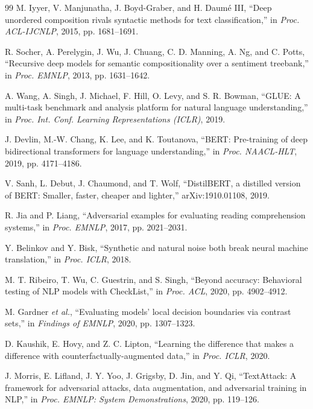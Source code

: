 \documentclass[conference]{IEEEtran}
\begin{document}
\begin{thebibliography}{99}
 M. Iyyer, V. Manjunatha, J. Boyd-Graber, and H. Daum\'e III, ``Deep unordered composition rivals syntactic methods for text classification,'' in \emph{Proc. ACL-IJCNLP}, 2015, pp. 1681--1691.

 R. Socher, A. Perelygin, J. Wu, J. Chuang, C. D. Manning, A. Ng, and C. Potts, ``Recursive deep models for semantic compositionality over a sentiment treebank,'' in \emph{Proc. EMNLP}, 2013, pp. 1631--1642.

 A. Wang, A. Singh, J. Michael, F. Hill, O. Levy, and S. R. Bowman, ``GLUE: A multi-task benchmark and analysis platform for natural language understanding,'' in \emph{Proc. Int. Conf. Learning Representations (ICLR)}, 2019.

 J. Devlin, M.-W. Chang, K. Lee, and K. Toutanova, ``BERT: Pre-training of deep bidirectional transformers for language understanding,'' in \emph{Proc. NAACL-HLT}, 2019, pp. 4171--4186.

 V. Sanh, L. Debut, J. Chaumond, and T. Wolf, ``DistilBERT, a distilled version of BERT: Smaller, faster, cheaper and lighter,'' arXiv:1910.01108, 2019.

 R. Jia and P. Liang, ``Adversarial examples for evaluating reading comprehension systems,'' in \emph{Proc. EMNLP}, 2017, pp. 2021--2031.

 Y. Belinkov and Y. Bisk, ``Synthetic and natural noise both break neural machine translation,'' in \emph{Proc. ICLR}, 2018.

 M. T. Ribeiro, T. Wu, C. Guestrin, and S. Singh, ``Beyond accuracy: Behavioral testing of NLP models with CheckList,'' in \emph{Proc. ACL}, 2020, pp. 4902--4912.

 M. Gardner \emph{et al.}, ``Evaluating models' local decision boundaries via contrast sets,'' in \emph{Findings of EMNLP}, 2020, pp. 1307--1323.

 D. Kaushik, E. Hovy, and Z. C. Lipton, ``Learning the difference that makes a difference with counterfactually-augmented data,'' in \emph{Proc. ICLR}, 2020.

 J. Morris, E. Lifland, J. Y. Yoo, J. Grigsby, D. Jin, and Y. Qi, ``TextAttack: A framework for adversarial attacks, data augmentation, and adversarial training in NLP,'' in \emph{Proc. EMNLP: System Demonstrations}, 2020, pp. 119--126.


\end{thebibliography}
\end{document}
